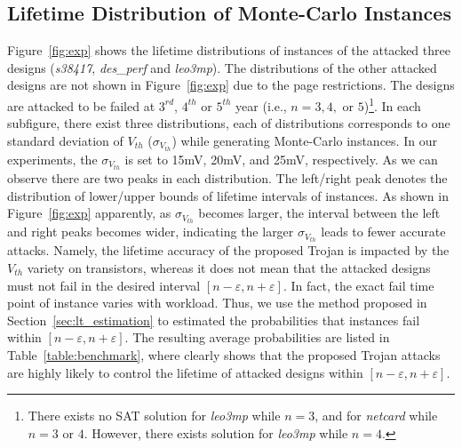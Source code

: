 \subsection{Lifetime Distribution of Monte-Carlo Instances}
\label{sec:exp:exp}
Figure~\ref{fig:exp} shows the lifetime distributions of instances of the attacked three designs (\textit{s38417}, \textit{des\_perf} and \textit{leo3mp}). The distributions of the other attacked designs are not shown in Figure~\ref{fig:exp} due to the page restrictions. The designs are attacked to be failed at $3^{rd}$, $4^{th}$ or $5^{th}$ year (i.e., $n = 3, 4,$ or $5$)\footnote{There exists no SAT solution for \textit{leo3mp} while $n = 3$, and for \textit{netcard} while $n = 3$ or $4$. However, there exists solution for \textit{leo3mp} while $n = 4$.}. In each subfigure, there exist three distributions, each of distributions corresponds to one standard deviation of $V_{th}$ ($\sigma_{V_{th}}$) while generating Monte-Carlo instances. In our experiments, the $\sigma_{V_{th}}$ is set to 15mV, 20mV, and 25mV, respectively. As we can observe there are two peaks in each distribution. The left/right peak denotes the distribution of lower/upper bounds of lifetime intervals of instances. %
As shown in Figure~\ref{fig:exp} apparently, as $\sigma_{V_{th}}$ becomes larger, the interval between the left and right peaks becomes wider, indicating the larger $\sigma_{V_{th}}$ leads to fewer accurate attacks. Namely, the lifetime accuracy of the proposed Trojan is impacted by the $V_{th}$ variety on transistors, whereas it does not mean that the attacked designs must not fail in the desired interval $[n-\varepsilon,n+\varepsilon]$. In fact, the exact fail time point of instance varies with workload.  Thus, we use the method proposed in Section~\ref{sec:lt_estimation} to estimated the probabilities that instances fail within $[n-\varepsilon,n+\varepsilon]$. The resulting average probabilities are listed in Table~\ref{table:benchmark}, where clearly shows that the proposed Trojan attacks are highly likely to control the lifetime of attacked designs within $[n-\varepsilon,n+\varepsilon]$.%

